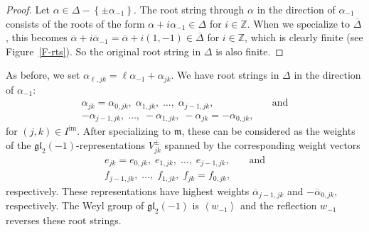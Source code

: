 \documentclass[11pt,letterpaper]{amsart}
\numberwithin{thecounter}{section}
\theoremstyle{definition}
\DeclareMathOperator{\gl}{\mathfrak{gl}}
\DeclareMathOperator{\im}{{im}}
\renewcommand{\a}{\alpha}
\newcommand{\Z}{{\mathbb Z}}
\begin{document}
\begin{longver}
\begin{proof}
Let $\a\in\Delta-\left\{\pm\a_{-1} \right\}$.  The root string through $\a$ in the direction of $\a_{-1}$ consists of the roots
of the form $\a+i\a_{-1}\in \Delta$ for $i\in\Z$.
When we specialize to $\overline\Delta$, this becomes $\overline\a+i\overline\a_{-1}= \overline\a+i(1,-1)\in
\overline\Delta$ for $i\in\Z$, which is clearly finite (see Figure~\ref{F-rts}). So the original root string in $\Delta$ is also finite.
\end{proof}
\end{longver}

As before, we set  $\a_{\ell,jk}= \ell\a_{-1}+\a_{jk}$.
We have root strings in $\Delta$ in the direction of $\a_{-1}$:
\begin{align*}
\a_{jk}=\a_{0,jk},\; \a_{1,jk},\;\dots,\; \a_{j-1,jk}, &\quad \text{and}\\
-\a_{j-1,jk}, \;\dots,\; -\a_{1,jk},\;-\a_{jk}=-\a_{0,jk},&
\end{align*}
for $(j,k)\in I^{\im}$.
After specializing to $\mathfrak{m}$, these can be considered as the weights of the $\mathfrak{gl}_2(-1)$-representations 
$V_{jk}^\pm$ spanned by the corresponding weight vectors
\begin{align*}
e_{jk}=e_{0,jk},\; e_{1,jk},\;\dots,\; e_{j-1,jk}, &\quad \text{and}\\
f_{j-1,jk},\; \dots,\; f_{1,jk},\;f_{jk}=f_{0,jk},&
\end{align*}
respectively. %
These representations have highest weights $\overline{\a}_{j-1,jk}$ and $-\overline{\a}_{0,jk}$, respectively.
The Weyl group of  $\mathfrak{gl}_2(-1)$ is $\left\langle w_{-1} \right\rangle$ and the reflection $w_{-1}$ reverses these root strings. 

\end{document}
